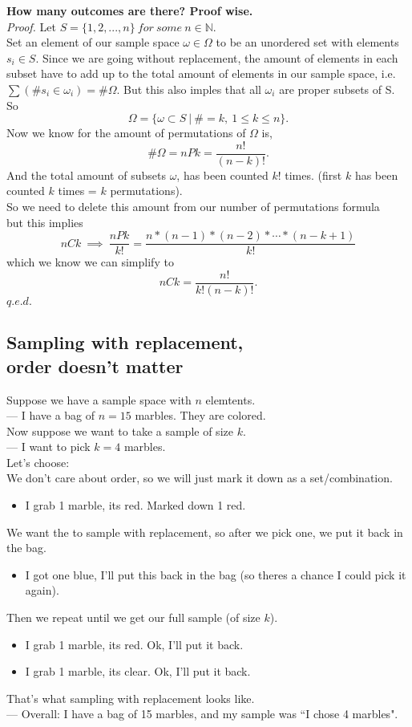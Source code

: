 \documentclass[12pt]{book}
\begin{document}
\noindent \textbf{How many outcomes are there? Proof wise.}\\
\textit{Proof.}
Let $S=\{1,2,...,n\}~for~some~n\in \mathbb{N}$.\\
Set an element of our sample space $\omega \in \Omega$ to be an unordered set with elements $s_i\in S$. Since we are going without replacement, the amount of elements in each subset have to add up to the total amount of elements in our sample space, i.e. $\sum (\#s_i \in  \omega _i) = \#\Omega$. But this also imples that all $\omega_i$ are proper subsets of S. \\
So $$\Omega = \big\{  \omega \subset S ~\big|~ \# = k,~1\leq k \leq n  \big\}.$$
Now we know for the amount of permutations of $\Omega$ is,
$$ \#\Omega = nPk = \frac{n!}{(n-k)!}.$$
And the total amount of subsets $\omega$, has been counted $k!$ times. (first $k$ has been counted $k$ times = $k$ permutations). \\
So we need to delete this amount from our number of permutations formula\\
but this implies\\
$${nCk} ~\implies~{ \frac{nPk}{k!} = \frac{n*(n-1)*(n-2)* \cdots *(n-k+1)}{k!}}$$
which we know we can simplify to
$$nCk = \frac{n!}{k!(n-k)!}.$$\hfill$q.e.d.$





\subsection{Sampling with replacement,\\ order doesn't matter}
Suppose we have a sample space with $n$ elemtents. \\
--- I have a bag of $n=15$ marbles. They are colored.\\
Now suppose we want to take a sample of size $k$. \\
--- I want to pick $k=4$ marbles.\\

\noindent Let's choose: \\
We don't care about order, so we will just mark it down as a set/combination.
\begin{itemize}
\item I grab 1 marble, its red. Marked down 1 red.
\end{itemize}
We want the to sample with replacement, so after we pick one, we put it back in the bag. 
\begin{itemize}
\item I got one blue, I'll put this back in the bag (so theres a chance I could pick it again).
\end{itemize}
Then we repeat until we get our full sample (of size $k$). 
\begin{itemize}
\item I grab 1 marble, its red. Ok, I'll put it back. 
\item I grab 1 marble, its clear. Ok, I'll put it back.
\end{itemize}
That's what sampling with replacement looks like. \\
--- Overall: I have a bag of 15 marbles, and my sample was ``I chose 4 marbles". 
\end{document}
